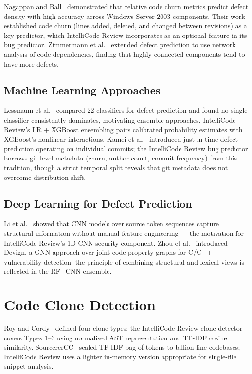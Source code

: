 \documentclass[12pt, oneside]{report}
\begin{document}
Nagappan and Ball~\cite{nagappan2005} demonstrated that relative code churn metrics predict
defect density with high accuracy across Windows Server 2003 components. Their work
established code churn (lines added, deleted, and changed between revisions) as a key
predictor, which IntelliCode Review incorporates as an optional feature in its bug
predictor. Zimmermann et al.~\cite{zimmermann2007} extended defect prediction to use
network analysis of code dependencies, finding that highly connected components tend to
have more defects.

\subsection{Machine Learning Approaches}

Lessmann et al.~\cite{lessmann2008} compared 22 classifiers for defect prediction and found no single classifier consistently dominates, motivating ensemble approaches. IntelliCode Review's LR + XGBoost ensembling pairs calibrated probability estimates with XGBoost's nonlinear interactions. Kamei et al.~\cite{kamei2013} introduced just-in-time defect prediction operating on individual commits; the IntelliCode Review bug predictor borrows git-level metadata (churn, author count, commit frequency) from this tradition, though a strict temporal split reveals that git metadata does not overcome distribution shift.

\subsection{Deep Learning for Defect Prediction}

Li et al.~\cite{li2017} showed that CNN models over source token sequences capture structural information without manual feature engineering — the motivation for IntelliCode Review's 1D CNN security component. Zhou et al.~\cite{zhou2019} introduced Devign, a GNN approach over joint code property graphs for C/C++ vulnerability detection; the principle of combining structural and lexical views is reflected in the RF+CNN ensemble.

\section{Code Clone Detection}
\label{sec:rel-clone}

Roy and Cordy~\cite{roy2007} defined four clone types; the IntelliCode Review clone detector covers Types 1--3 using normalised AST representation and TF-IDF cosine similarity. SourcererCC~\cite{sajnani2016} scaled TF-IDF bag-of-tokens to billion-line codebases; IntelliCode Review uses a lighter in-memory version appropriate for single-file snippet analysis.
\end{document}
